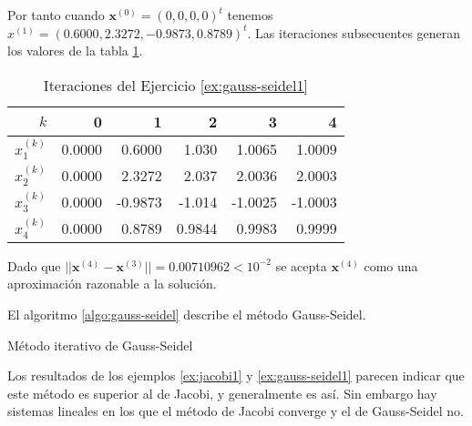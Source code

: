 \begin{exerciseT}
Por tanto cuando $\textbf{x}^{(0)} = (0,0,0,0)^t$ tenemos $x^{(1)} = (0.6000, 2.3272, -0.9873, 0.8789)^t$. Las iteraciones subsecuentes generan los valores
de la tabla \ref{table:gauss-seidel1}.

\begin{table}[H]
	\centering
	\begin{tabular}{r|rrrrr}
		\toprule
		$k$ & 0 & 1 & 2 & 3 & 4 \\\midrule
		$x_1^{(k)}$ & 0.0000 & 0.6000 & 1.030 & 1.0065 & 1.0009 \\
		$x_2^{(k)}$ & 0.0000 & 2.3272 & 2.037 & 2.0036 & 2.0003 \\
		$x_3^{(k)}$ & 0.0000 &-0.9873 &-1.014 &-1.0025 &-1.0003 \\
		$x_4^{(k)}$ & 0.0000 & 0.8789 &0.9844 & 0.9983 & 0.9999 \\
		\bottomrule
	\end{tabular}
	\caption{Iteraciones del Ejercicio \ref{ex:gauss-seidel1}}
    \label{table:gauss-seidel1}
\end{table}  

Dado que $||\textbf{x}^{(4)} - \textbf{x}^{(3)}|| = 0.00710962 < 10^{-2}$ se acepta $\textbf{x}^{(4)}$ como una aproximación razonable a la solución.  
\label{ex:gauss-seidel1}
\end{exerciseT}

El algoritmo \ref{algo:gauss-seidel} describe el método Gauss-Seidel.

\begin{algorithm}[ht]
\caption{Método iterativo de Gauss-Seidel}
\label{algo:gauss-seidel}
\end{algorithm}

Los resultados de los ejemplos \ref{ex:jacobi1} y \ref{ex:gauss-seidel1} parecen indicar que este método es superior al de Jacobi, y generalmente es 
así. Sin embargo hay sistemas lineales en los que el método de Jacobi converge y el de Gauss-Seidel no.

